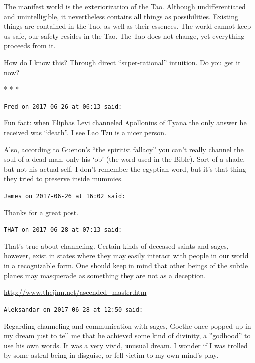 The manifest world is the exteriorization of the Tao. Although undifferentiated and unintelligible, it nevertheless contains all things as possibilities. Existing things are contained in the Tao, as well as their essences. The world cannot keep us safe, our safety resides in the Tao. The Tao does not change, yet everything proceeds from it.

How do I know this? Through direct ``super-rational'' intuition. Do you get it now?



\begin{center}* * *\end{center}

\begin{footnotesize}
\begin{sffamily}
\texttt{Fred on 2017-06-26 at 06:13 said:}

Fun fact: when Eliphas Levi channeled Apollonius of Tyana the only answer he received was ``death''. I see Lao Tzu is a nicer person.

Also, according to Guenon's ``the spiritist fallacy'' you can't really channel the soul of a dead man, only his `ob' (the word used in the Bible). Sort of a shade, but not his actual self. I don't remember the egyptian word, but it's that thing they tried to preserve inside mummies.

\hfill

\texttt{James on 2017-06-26 at 16:02 said:}

Thanks for a great post.

\hfill

\texttt{THAT on 2017-06-28 at 07:13 said:}

That's true about channeling. Certain kinds of deceased saints and sages, however, exist in states where they may easily interact with people in our world in a recognizable form. One should keep in mind that other beings of the subtle planes may masquerade as something they are not as a deception.

\url{http://www.thejinn.net/ascended_master.htm}


\hfill

\texttt{Aleksandar on 2017-06-28 at 12:50 said:}

Regarding channeling and communication with sages, Goethe once popped up in my dream just to tell me that he achieved some kind of divinity, a ''godhood'' to use his own words. It was a very vivid, unusual dream. I wonder if I was trolled by some astral being in disguise, or fell victim to my own mind's play.


\end{sffamily}
\end{footnotesize}
